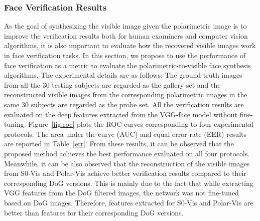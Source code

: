 \documentclass[10pt,twocolumn,letterpaper]{article}
\begin{document}
\subsubsection{Face Verification Results}
As the goal of synthesizing the visible image given the  polarimetric image is to improve the verification results both for human examiners and computer vision algorithms, it is also important  to evaluate how the recovered visible images work in face verification tasks.   In this section,  we propose to use the performance of face verification as a metric to evaluate the polarimetric-to-visible face synthesis algorithms. The experimental details are as follows:  The ground truth images from all the 30 testing subjects are regarded as the  gallery set and the reconstructed visible images from the corresponding polarimetric images in the same 30 subjects are regarded as the probe set.  All the verification results are evaluated on the deep features extracted from the VGG-face model \cite{vggface} without fine-tuning.  Figure~\ref{fig:roc} plots the ROC curves corresponding to four experimental protocols.   The area under the curve (AUC)  and equal error rate (EER) results are reported  in Table~\ref{err}. From these results, it can be observed that the proposed method achieves the best performance evaluated on all four protocols. Meanwhile, it can be also observed that the reconstruction of the visible images from S0-Vis and Polar-Vis achieve  better verification results compared to their corresponding DoG versions.   This is mainly due to the fact that while extracting VGG features from the DoG filtered images, the network was not fine-tuned based on DoG images.   Therefore, features extracted for S0-Vis and Polar-Vis are better than features for their corresponding DoG versions.
\end{document}
